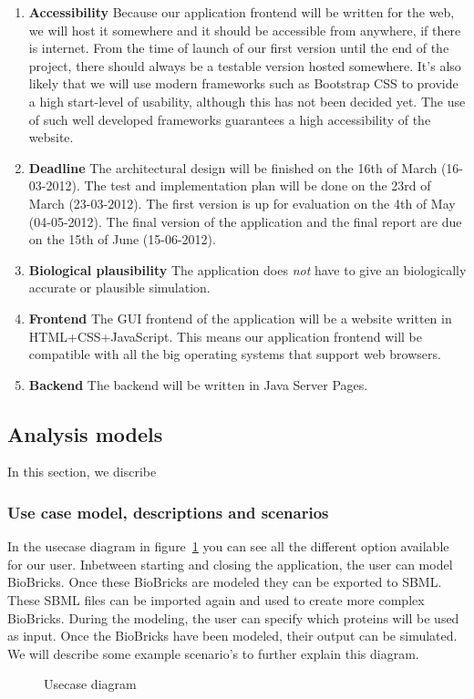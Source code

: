\documentclass[a4paper]{article}
\begin{document}
\begin{enumerate}
\item \textbf{Accessibility} Because our application frontend will be written for the web, we will host it somewhere and it should be accessible from anywhere, if there is internet. From the time of launch of our first version until the end of the project, there should always be a testable version hosted somewhere. It's also likely that we will use modern frameworks such as Bootstrap CSS to provide a high start-level of usability, although this has not been decided yet. The use of such well developed frameworks guarantees a high accessibility of the website.

\item \textbf{Deadline} The architectural design will be finished on the 16th of March (16-03-2012). The test and implementation plan will be done on the 23rd of March (23-03-2012). The first version is up for evaluation on the 4th of May (04-05-2012). The final version of the application and the final report are due on the 15th of June (15-06-2012).
\item \textbf{Biological plausibility} The application does \textit{not} have to give an biologically accurate or plausible simulation.

\item \textbf{Frontend} The GUI frontend of the application will be a website written in HTML+CSS+JavaScript. This means our application frontend will be compatible with all the big operating systems that support web browsers.\item \textbf{Backend} The backend will be written in Java Server Pages.
 
\end{enumerate}
\pagebreak
\subsection{Analysis models}
In this section, we discribe


\subsubsection{Use case model, descriptions and scenarios}
In the usecase diagram in figure~\ref{fig-usecase} you can see all the different option available for our user. 
Inbetween starting and closing the application, the user can model BioBricks. 
Once these BioBricks are modeled they can be exported to SBML. 
These SBML files can be imported again and used to create more complex BioBricks. 
During the modeling, the user can specify which proteins will be used as input.
Once the BioBricks have been modeled, their output can be simulated.
We will describe some example scenario's to further explain this diagram.
\begin{figure}[h!]
	\caption{Usecase diagram}
	\label{fig-usecase}
	\centering
\end{figure}
\end{document}
